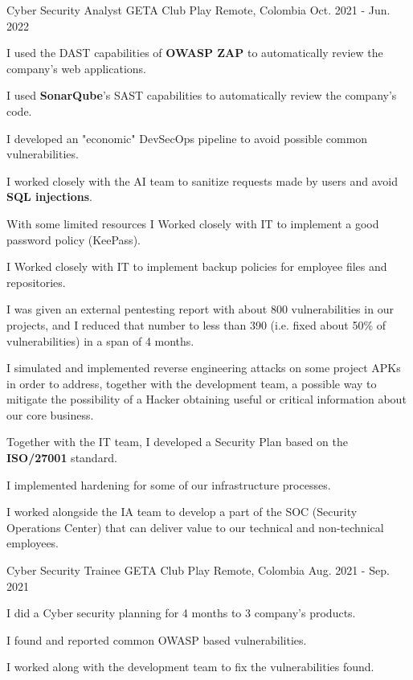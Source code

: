 \begin{cventries}
  \cventry
  {Cyber Security Analyst} %
  {GETA Club Play} %
  {Remote, Colombia} %
  {Oct. 2021 - Jun. 2022} %
  {
    \begin{cvitems} %
      \item {I used the DAST capabilities of \textbf{OWASP ZAP} to automatically review the company's web
                  applications.}
      \item {I used \textbf{SonarQube}'s SAST capabilities to automatically review the company's code.}
      \item {I developed an "economic" DevSecOps pipeline to avoid possible common
                  vulnerabilities.}
      \item {I worked closely with the AI team to sanitize requests made by users and avoid \textbf{SQL injections}.}
      \item {With some limited resources I Worked closely with IT to implement a good password
                  policy (KeePass).}
      \item {I Worked closely with IT to implement backup policies for employee files and
                  repositories.}
      \item {I was given an external pentesting report with about 800 vulnerabilities in our
                  projects, and I reduced that number to less than 390 (i.e. fixed about 50\% of
                  vulnerabilities) in a span of 4 months.}
      \item {I simulated and implemented reverse engineering attacks on some project APKs in order
                  to address, together with the development team, a possible way to mitigate the possibility
                  of a Hacker obtaining useful or critical information about our core business.}
      \item {Together with the IT team, I developed a Security Plan based on the \textbf{ISO/27001}
                  standard.}
      \item {I implemented hardening for some of our infrastructure processes.}
      \item {I worked alongside the IA team to develop a part of the SOC (Security Operations
                  Center) that can deliver value to our technical and non-technical employees.}
    \end{cvitems}
  }

  \cventry
  {Cyber Security Trainee} %
  {GETA Club Play} %
  {Remote, Colombia} %
  {Aug. 2021 - Sep. 2021} %
  {
    \begin{cvitems} %
      \item {I did a Cyber security planning for 4 months to 3 company's products.}
      \item {I found and reported common OWASP based vulnerabilities.}
      \item {I worked along with the development team to fix the vulnerabilities found.}
    \end{cvitems}
  }


\end{cventries}
